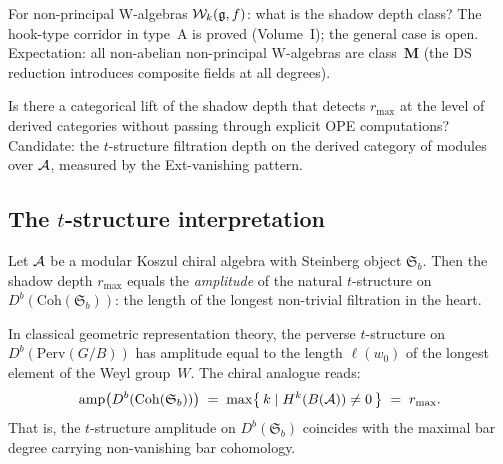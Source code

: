 \begin{openproblem}
For non-principal W-algebras $\mathcal{W}_k(\mathfrak{g}, f)$:
what is the shadow depth class? The hook-type corridor
in type~A is proved
(Volume~I); the general case
is open. Expectation: all non-abelian non-principal
W-algebras are class~$\mathbf{M}$ (the DS reduction
introduces composite fields at all degrees).
\end{openproblem}

\begin{openproblem}
\label{open:thqg-categorical}
Is there a categorical lift of the shadow depth that
detects $r_{\max}$ at the level of derived categories
without passing through explicit OPE computations?
Candidate: the $t$-structure filtration depth on the
derived category of modules over $\mathcal{A}$, measured by
the Ext-vanishing pattern.
\end{openproblem}


\subsection{The \texorpdfstring{$t$}{t}-structure interpretation}

\providecommand{\Steinberg}{\mathfrak{S}}

\begin{conjecture}
\label{conj:shadow-t-amplitude}
\ClaimStatusConjectured
Let $\mathcal{A}$ be a modular Koszul chiral algebra with
Steinberg object $\Steinberg_b$. Then the shadow depth
$r_{\max}$ equals the \emph{amplitude} of the natural
$t$-structure on $D^b(\mathrm{Coh}(\Steinberg_b))$: the
length of the longest non-trivial filtration in the heart.

In classical geometric representation theory, the
perverse $t$-structure on $D^b(\mathrm{Perv}(G/B))$ has
amplitude equal to the length $\ell(w_0)$ of the longest
element of the Weyl group~$W$. The chiral analogue reads:
\[
 \mathrm{amp}\bigl(D^b(\mathrm{Coh}(\Steinberg_b))\bigr)
 \;=\;
 \max\bigl\{\, k \mid H^k(B(\cA)) \neq 0 \,\bigr\}
 \;=\;
 r_{\max}.
\]
That is, the $t$-structure amplitude on $D^b(\Steinberg_b)$
coincides with the maximal bar degree carrying non-vanishing
bar cohomology.
\end{conjecture}

